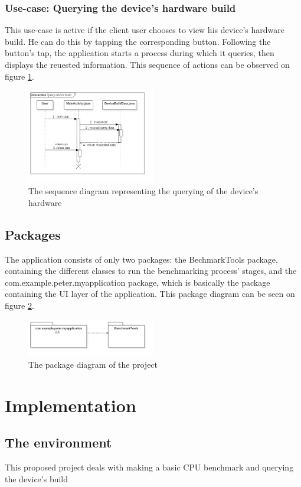 \documentclass[a4paper,10pt]{report}
\begin{document}
 \pagebreak
 \subsection{Use-case: Querying the device's hardware build}
 This use-case is active if the client user chooses to view his device's hardware build. He can do this by tapping the corresponding button. Following the button's tap, the application starts a process during which it queries, then displays the reuested information. This sequence of actions can be observed on figure \ref{fig:querySeqDiag1}.
 
 \begin{figure}[h]
  \centering
  \includegraphics[width=0.5\textwidth]{SequenceDiagram_DeviceBuild.png}
  \caption{The sequence diagram representing the querying of the device's hardware}
  \label{fig:querySeqDiag1}
 \end{figure}
 
 \pagebreak
 \section{Packages}
 The application consists of only two packages: the BechmarkTools package, containing the different classes to run the benchmarking process' stages, and the com.example.peter.myapplication package, which is basically the package containing the UI layer of the application. This package diagram can be seen on figure \ref{fig:packageDiag1}.
 
 \begin{figure}[h]
  \centering
  \includegraphics[width=0.5\textwidth]{PackageDiagram1.png}
  \caption{The package diagram of the project}
  \label{fig:packageDiag1}
  
 \end{figure}

\chapter{Implementation}
 \section{The environment}
 This proposed project deals with making a basic CPU benchmark and querying the device's build
\end{document}
